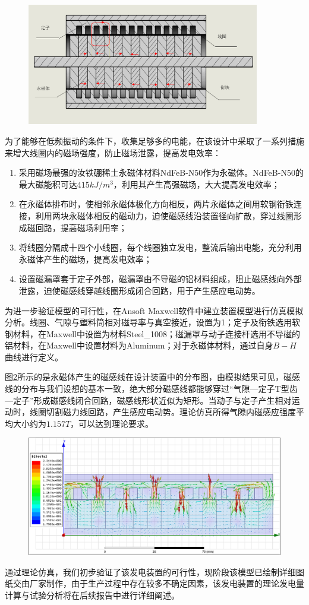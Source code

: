 \begin{figure}[H]
\centering
{}
\label{powerstation}
\includegraphics[width=4in]{figure/straight}
\end{figure}

为了能够在低频振动的条件下，收集足够多的电能，在该设计中采取了一系列措施来增大线圈内的磁场强度，防止磁场泄露，提高发电效率：

\begin{enumerate}[leftmargin=*,labelindent=16pt,label=\bfseries \arabic*.]
	\item 采用磁场最强的汝铁硼稀土永磁体材料NdFeB-N50作为永磁体。NdFeB-N50的最大磁能积可达$415kJ/m^3$，利用其产生高强磁场，大大提高发电效率；
	\item 在永磁体排布时，使相邻永磁体极化方向相反，两片永磁体之间用软钢衔铁连接，利用两块永磁体相反的磁动力，迫使磁感线沿装置径向扩散，穿过线圈形成磁回路，提高磁场利用率；
	\item 将线圈分隔成十四个小线圈，每个线圈独立发电，整流后输出电能，充分利用永磁体产生的磁场，提高发电效率；
	\item 设置磁漏罩套于定子外部，磁漏罩由不导磁的铝材料组成，阻止磁感线向外部泄露，迫使磁感线穿越线圈形成闭合回路，用于产生感应电动势。
\end{enumerate}

为进一步验证模型的可行性，在Ansoft Maxwell软件中建立装置模型进行仿真模拟分析。线圈、气隙与塑料筒相对磁导率与真空接近，设置为1；定子及衔铁选用软钢材料，在Maxwell中设置为材料Steel\_1008；磁漏罩与动子连接杆选用不导磁的铝材料，在Maxwell中设置材料为Aluminum；对于永磁体材料，通过自身$B-H$曲线进行定义。

图\ref{simu}所示的是永磁体产生的磁感线在设计装置中的分布图，由模拟结果可见，磁感线的分布与我们设想的基本一致，绝大部分磁感线都能够穿过“气隙—定子T型齿—定子”形成磁感线闭合回路，磁感线形状近似为矩形。当动子与定子产生相对运动时，线圈切割磁力线回路，产生感应电动势。理论仿真所得气隙内磁感应强度平均大小约为$1.157T$，可以达到理论要求。

\begin{figure}[htb]
	\centering
	\label{simu}
	\includegraphics[width=5in]{figure/simu}
\end{figure}

通过理论仿真，我们初步验证了该发电装置的可行性，现阶段该模型已绘制详细图纸交由厂家制作，由于生产过程中存在较多不确定因素，该发电装置的理论发电量计算与试验分析将在后续报告中进行详细阐述。